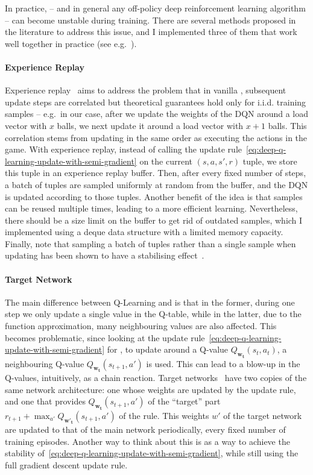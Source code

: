 In practice, \DQL -- and in general any off-policy deep reinforcement learning algorithm -- can become unstable during training. There are several methods proposed in the literature to address this issue, and I implemented three of them that work well together in practice (see e.g.~\cite{mnih2015dqnstabilitycombined}).


\paragraph{Experience Replay}

Experience replay~\cite{lin1992experiencereplay} aims to address the problem that in vanilla \DQL, subsequent update steps are correlated but theoretical guarantees hold only for i.i.d. training samples -- e.g.\  in our case, after we update the weights of the DQN around a load vector with $x$ balls, we next update it around a load vector with $x+1$ balls. This correlation stems from updating in the same order as executing the actions in the game. With experience replay, instead of calling the update rule~\eqref{eq:deep-q-learning-update-with-semi-gradient} on the current $(s, a, s', r)$ tuple, we store this tuple in an experience replay buffer. Then, after every fixed number of steps, a batch of tuples are sampled uniformly at random from the buffer, and the DQN is updated according to those tuples. Another benefit of the idea is that samples can be reused multiple times, leading to a more efficient learning. Nevertheless, there should be a size limit on the buffer to get rid of outdated samples, which I implemented using a deque data structure with a limited memory capacity. Finally, note that sampling a batch of tuples rather than a single sample when updating has been shown to have a stabilising effect~\cite{qian2020batchingsgd}.


\paragraph{Target Network}


The main difference between Q-Learning and \DQL is that in the former, during one step we only update a single value in the Q-table, while in the latter, due to the function approximation, many neighbouring values are also affected. This becomes problematic, since looking at the update rule~\eqref{eq:deep-q-learning-update-with-semi-gradient} for \DQL, to update around a Q-value $Q_{\mathbf{w_t}}(s_t, a_t)$, a neighbouring Q-value $Q_{\mathbf{w_t}}(s_{t+1}, a')$ is used. This can lead to a blow-up in the Q-values, intuitively, as a chain reaction. Target networks~\cite{argueta1992targetnetwork} have two copies of the same network architecture: one whose weights are updated by the update rule, and one that provides $Q_{\mathbf{w_t}}(s_{t+1}, a')$ of the ``target'' part $r_{t+1}+ \max_{a'} Q_{\mathbf{w'_t}}(s_{t+1}, a')$ of the rule. This weights $w'$ of the target network are updated to that of the main network periodically, every fixed number of training episodes. Another way to think about this is as a way to achieve the stability of~\eqref{eq:deep-q-learning-update-with-semi-gradient}, while still using the full gradient descent update rule.


